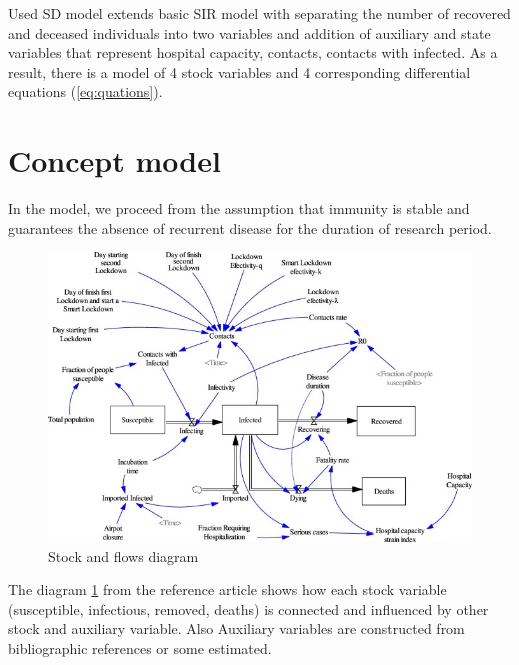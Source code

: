 \documentclass[12pt,a4paper,english]{article}
\begin{document}
    Used SD model extends basic SIR model with separating the number of recovered and deceased individuals into two variables and addition of auxiliary and state variables that represent hospital capacity, contacts, contacts with infected. 
    As a result, there is a model of 4 stock variables and 4 corresponding differential equations (\ref{eq:quations}).

    \section{Concept model} \label{conc_model}
    In the model, we proceed from the assumption that immunity is stable and guarantees the absence of recurrent disease for the duration of research period. 
    
    \begin{center}
        \begin{figure}[ht!]
            \includegraphics[scale=1]{1-s2.0-S0048969720324347-gr1.jpg}
            \caption{Stock and flows diagram}
            \label{fig:graph}
        \end{figure}
    \end{center}
    
    The diagram \ref{fig:graph}  from the reference article shows how each stock variable (susceptible, infectious, removed, deaths) is connected and influenced by other stock and auxiliary variable.
    Also 
    Auxiliary variables are constructed from bibliographic references or some estimated.
    
\end{document}
